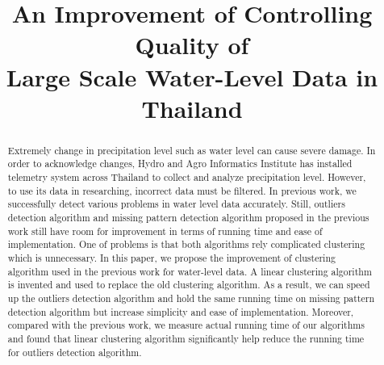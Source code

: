 \documentclass[conference]{IEEEtran}
\begin{document}
\title{An Improvement of Controlling Quality of \\Large Scale Water-Level Data in Thailand}

\author{
\and
{}
}

\maketitle


\begin{abstract}
Extremely change in precipitation level such as water level can cause severe damage. In order to acknowledge changes, Hydro and Agro Informatics Institute has installed telemetry system across Thailand to collect and analyze precipitation level. However, to use its data in researching, incorrect data must be filtered. In previous work, we successfully detect various problems in water level data accurately. Still, outliers detection algorithm  and missing pattern detection algorithm proposed in the previous work still have room for improvement in terms of running time and ease of implementation. One of problems is that both algorithms rely complicated clustering which is unnecessary. In this paper, we propose the improvement of clustering algorithm used in the previous work for water-level data. A linear clustering algorithm is invented and used to replace the old clustering algorithm. As a result, we can speed up the outliers detection algorithm and hold the same running time on missing pattern detection algorithm but increase simplicity and ease of implementation. Moreover, compared with the previous work, we measure actual running time of our algorithms and found that linear clustering algorithm significantly help reduce the running time for outliers detection algorithm.

\end{abstract}
\end{document}
